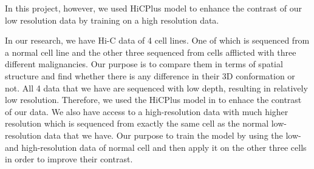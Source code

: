 \documentclass{article}
\begin{document}
In this project, however,
we used HiCPlus
model to enhance the contrast of our
low resolution data by training on
a high resolution data.

In our research, we have Hi-C data of
4 cell lines. One of which is sequenced
from a normal cell line and the other
three sequenced from cells afflicted
with three different malignancies.
Our purpose is to
compare them in terms of spatial
structure and find whether there is 
any difference in their 3D conformation
or not.
All 4 data that we have are sequenced
with low depth, resulting in relatively
low resolution. Therefore, we used the
HiCPlus model in \cite{zhang2018enhancing}
to enhace the contrast of our data.
We also have access to a high-resolution
data with much higher resolution which
is sequenced from exactly the same cell
as the normal low-resolution data that
we have. Our purpose to train the model
by using the low- and high-resolution data
of normal cell and then apply it on the 
other three cells in order to improve
their contrast.
\end{document}
